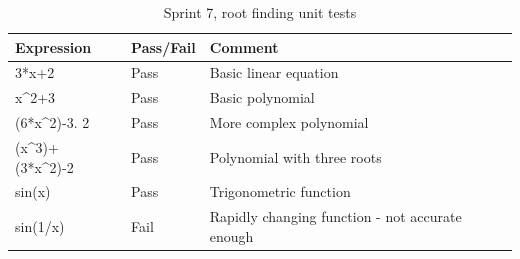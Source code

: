 \documentclass[a4paper, oneside, 11pt]{report}
\begin{document}
\begin{table}[h]
\caption{Sprint 7, root finding unit tests}
\label{sprint7-root-unit-test}
\begin{tabular}{|l|l|l|}
\hline
\textbf{Expression} & \textbf{Pass/Fail} & \textbf{Comment}                                                                     \\ \hline
3*x+2                 & Pass               & Basic linear equation                                                                \\ \hline
x\^{}2+3              & Pass               & Basic polynomial                                                                     \\ \hline
(6*x\^{}2)-3.  2      & Pass               & More complex polynomial                                                             \\ \hline
(x\^{}3)+(3*x\^{}2)-2 & Pass               & Polynomial with three roots                                                         \\ \hline
sin(x)                & Pass               & Trigonometric function                                                              \\ \hline
sin(1/x)              & Fail               & Rapidly changing function - not accurate enough                                     \\ \hline
\end{tabular}
\end{table}
\end{document}
